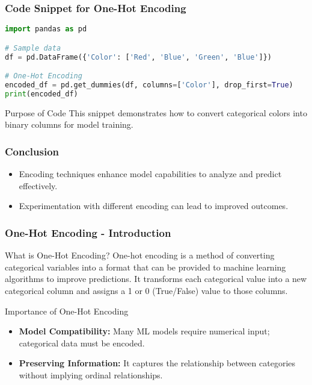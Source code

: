 \documentclass[aspectratio=169]{beamer}
\begin{document}
\begin{frame}[fragile]
    \frametitle{Code Snippet for One-Hot Encoding}
    \begin{lstlisting}[language=Python]
import pandas as pd

# Sample data
df = pd.DataFrame({'Color': ['Red', 'Blue', 'Green', 'Blue']})

# One-Hot Encoding
encoded_df = pd.get_dummies(df, columns=['Color'], drop_first=True)
print(encoded_df)
    \end{lstlisting}
    \begin{block}{Purpose of Code}
        This snippet demonstrates how to convert categorical colors into binary columns for model training.
    \end{block}
\end{frame}

\begin{frame}
    \frametitle{Conclusion}
    \begin{itemize}
        \item Encoding techniques enhance model capabilities to analyze and predict effectively.
        \item Experimentation with different encoding can lead to improved outcomes.
    \end{itemize}
\end{frame}

\begin{frame}[fragile]
    \frametitle{One-Hot Encoding - Introduction}
    \begin{block}{What is One-Hot Encoding?}
        One-hot encoding is a method of converting categorical variables into a format 
        that can be provided to machine learning algorithms to improve predictions. 
        It transforms each categorical value into a new categorical column and assigns 
        a 1 or 0 (True/False) value to those columns.
    \end{block}
    
    \begin{block}{Importance of One-Hot Encoding}
        \begin{itemize}
            \item \textbf{Model Compatibility:} Many ML models require numerical input; categorical data must be encoded.
            \item \textbf{Preserving Information:} It captures the relationship between categories without implying ordinal relationships.
        \end{itemize}
    \end{block}
\end{frame}
\end{document}
